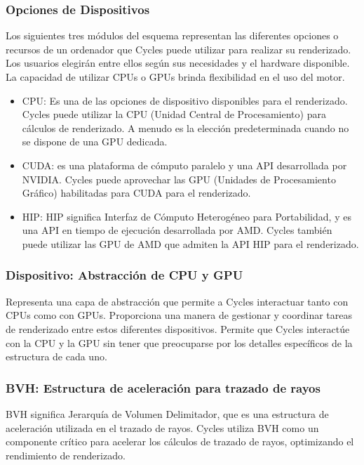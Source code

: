 \documentclass{article}
\begin{document}
\subsubsection{Opciones de Dispositivos}
Los siguientes tres módulos del esquema representan las diferentes opciones o recursos de un ordenador
que Cycles puede utilizar para realizar su renderizado. Los usuarios elegirán entre ellos según 
sus necesidades y el hardware disponible. La capacidad de utilizar CPUs o GPUs brinda 
flexibilidad en el uso del motor.
\begin{itemize}
  \item CPU: Es una de las opciones de dispositivo disponibles para el renderizado. Cycles puede
  utilizar la CPU (Unidad Central de Procesamiento) para cálculos de renderizado. A menudo es 
  la elección predeterminada cuando no se dispone de una GPU dedicada.
  \item CUDA: es una plataforma de cómputo paralelo y una API desarrollada por NVIDIA. Cycles 
  puede aprovechar las GPU (Unidades de Procesamiento Gráfico) habilitadas para CUDA para el 
  renderizado.
  \item HIP: HIP significa Interfaz de Cómputo Heterogéneo para Portabilidad, y es una API 
  en tiempo de ejecución desarrollada por AMD. Cycles también puede utilizar las GPU de AMD 
  que admiten la API HIP para el renderizado.
\end{itemize}

\subsubsection{Dispositivo: Abstracción de CPU y GPU}
Representa una capa de abstracción que permite a Cycles interactuar tanto con CPUs como 
con GPUs. Proporciona una manera de gestionar y coordinar tareas de renderizado entre estos 
diferentes dispositivos. Permite que Cycles interactúe con la CPU y la GPU sin tener que 
preocuparse por los detalles específicos de la estructura de cada uno.

\subsubsection{BVH: Estructura de aceleración para trazado de rayos}
BVH significa Jerarquía de Volumen Delimitador, que es una estructura de aceleración utilizada 
en el trazado de rayos. Cycles utiliza BVH como un componente crítico para acelerar los cálculos
de trazado de rayos, optimizando el rendimiento de renderizado.
\end{document}
